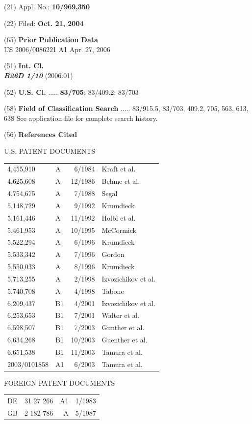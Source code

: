 \documentclass{article}
\begin{document}
\noindent (21) Appl. No.: \textbf{10/969,350}

\noindent (22) Filed: \textbf{Oct. 21, 2004}

\noindent (65) \textbf{Prior Publication Data}\\
US 2006/0086221 A1 Apr. 27, 2006

\noindent (51) \textbf{Int. Cl.}\\
\textbf{\textit{B26D 1/10}} (2006.01)

\noindent (52) \textbf{U.S. Cl.} ..... \textbf{83/705}; 83/409.2; 83/703

\noindent (58) \textbf{Field of Classification Search} ..... 83/915.5, 83/703, 409.2, 705, 563, 613, 638 See application file for complete search history.

\noindent (56) \textbf{References Cited}

\noindent U.S. PATENT DOCUMENTS\par\nopagebreak
\noindent \begin{tabular}{@{}l@{\quad}l@{\quad}r@{\quad}l@{}}
4,455,910 & A & 6/1984 & Kraft et al.\\
4,625,608 & A & 12/1986 & Behme et al.\\
4,754,675 & A & 7/1988 & Segal\\
5,148,729 & A & 9/1992 & Krumdieck\\
5,161,446 & A & 11/1992 & Holbl et al.\\
5,461,953 & A & 10/1995 & McCormick\\
5,522,294 & A & 6/1996 & Krumdieck\\
5,533,342 & A & 7/1996 & Gordon\\
5,550,033 & A & 8/1996 & Krumdieck\\
5,713,255 & A & 2/1998 & Izvozichikov et al.\\
5,740,708 & A & 4/1998 & Tabone\\
6,209,437 & B1 & 4/2001 & Izvozichikov et al.\\
6,253,653 & B1 & 7/2001 & Walter et al.\\
6,598,507 & B1 & 7/2003 & Gunther et al.\\
6,634,268 & B1 & 10/2003 & Guenther et al.\\
6,651,538 & B1 & 11/2003 & Tamura et al.\\
2003/0101858 & A1 & 6/2003 & Tamura et al.\\
\end{tabular}

\noindent FOREIGN PATENT DOCUMENTS\par\nopagebreak
\noindent \begin{tabular}{@{}l@{\quad}l@{\quad}r@{\quad}l@{}}
DE & 31 27 266 & A1 & 1/1983\\
GB & 2 182 786 & A & 5/1987\\
\end{tabular}
\end{document}
